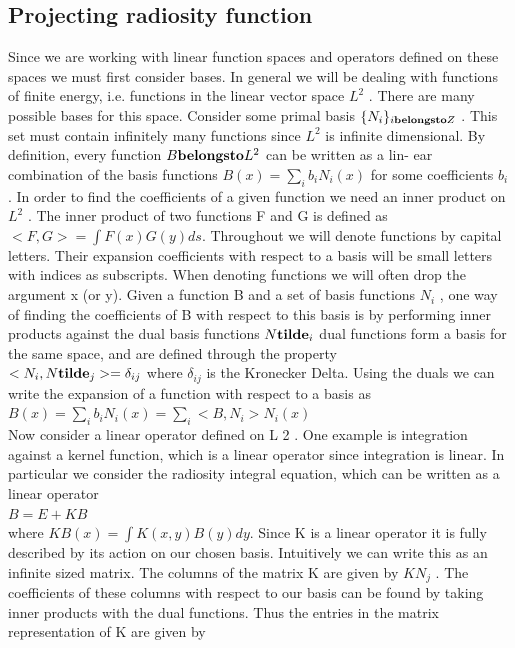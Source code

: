 \documentclass[12pt]{article}
\begin{document}
\subsection{Projecting radiosity function}
Since we are working with linear function spaces and operators
defined on these spaces we must first consider bases. In general
we will be dealing with functions of finite energy, i.e. functions
in the linear vector space $L^2$ . There are many possible bases for
this space. Consider some primal basis $\{N_i \}_{i{\bf belongs to}Z}$ . This set must contain infinitely many functions since $L^2$ is infinite dimensional.
By definition, every function $B{\bf belongs to}L^2$ can be written as a lin-
ear combination of the basis functions $B(x) = \sum _i b_i N_i(x)$ for
some coefficients $b_i$ . In order to find the coefficients of a given
function we need an inner product on $L^2$ . The inner product of
two functions F and G is defined as $<F, G> = \int F(x) G(y) ds$.
Throughout we will denote functions by capital letters. Their expansion coefficients with respect to a basis will be small letters
with indices as subscripts. When denoting functions we will often
drop the argument x (or y).
Given a function B and a set of basis functions $N_i$ , one way
of finding the coefficients of B with respect to this basis is by
performing inner products against the dual basis functions $N{\bf tilde}_i$
dual functions form a basis for the same space, and are defined
through the property\\
$<N_i,N{\bf tilde}_j>=\delta_{ij}$
where $\delta_{ij}$ is the Kronecker Delta. Using the duals we can write
the expansion of a function with respect to a basis as\\

$B(x) = \sum_ib_iN_i(x)= \sum_i<B,N_i>N_i(x)$\\

Now consider a linear operator defined on L 2 . One example is
integration against a kernel function, which is a linear operator since integration is linear. In particular we consider the radiosity
integral equation, which can be written as a linear operator\\

$B=E+KB$\\

where $KB(x) = \int K(x, y)B(y)dy$. Since K is a linear operator it
is fully described by its action on our chosen basis. Intuitively we
can write this as an infinite sized matrix. The columns of the matrix K are given by $KN_j$ . The coefficients of these columns with
respect to our basis can be found by taking inner products with
the dual functions. Thus the entries in the matrix representation
of K are given by\\
\end{document}

